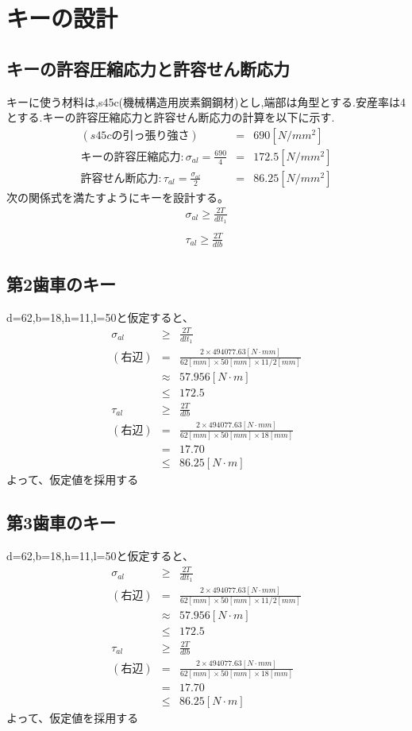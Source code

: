 \section{キーの設計}
\subsection{キーの許容圧縮応力と許容せん断応力}
キーに使う材料は,s45c(機械構造用炭素鋼鋼材)とし,端部は角型とする.安産率は4とする.キーの許容圧縮応力と許容せん断応力の計算を以下に示す.
\begin{eqnarray}
(s45cの引っ張り強さ)&=&690[N/mm^2]\\
キーの許容圧縮応力:\sigma_{al} = \frac{690}{4} &=& 172.5[N/mm^2]\\
許容せん断応力:\tau_{al}=\frac{\sigma_{al}}{2} &=& 86.25[N/mm^2]
\end{eqnarray}
次の関係式を満たすようにキーを設計する。
\begin{eqnarray}
\sigma_{al} \geq \frac{2T}{dlt_1}\\
\nonumber\\
\tau_{al} \geq \frac{2T}{dlb}
\end{eqnarray}
\subsection{第2歯車のキー}
d=62,b=18,h=11,l=50と仮定すると、
\begin{eqnarray}
\sigma_{al} &\geq& \frac{2T}{dlt_1}\\
(右辺) &=& \frac{2 \times 494077.63[N \cdot mm]}{62[mm] \times 50[mm] \times 11/2[mm]}\\
       &\approx&57.956[N \cdot m]\\
       &\leq& 172.5\\
\tau_{al} &\geq& \frac{2T}{dlb}\\
(右辺) &=& \frac{2 \times 494077.63[N \cdot mm]}{62[mm] \times 50[mm] \times 18[mm]}\\
       &=& 17.70\\
       &\leq&86.25[N \cdot m]
\end{eqnarray}
よって、仮定値を採用する
\subsection{第3歯車のキー}
d=62,b=18,h=11,l=50と仮定すると、
\begin{eqnarray}
\sigma_{al} &\geq& \frac{2T}{dlt_1}\\
(右辺) &=& \frac{2 \times 494077.63[N \cdot mm]}{62[mm] \times 50[mm] \times 11/2[mm]}\\
       &\approx&57.956[N \cdot m]\\
       &\leq& 172.5\\
\tau_{al} &\geq& \frac{2T}{dlb}\\
(右辺) &=& \frac{2 \times 494077.63[N \cdot mm]}{62[mm] \times 50[mm] \times 18[mm]}\\
       &=& 17.70\\
       &\leq&86.25[N \cdot m]
\end{eqnarray}
よって、仮定値を採用する
